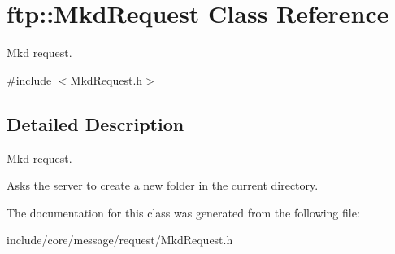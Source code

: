 \hypertarget{classftp_1_1_mkd_request}{\section{ftp\-:\-:Mkd\-Request Class Reference}
\label{classftp_1_1_mkd_request}
}


Mkd request.  




{\ttfamily \#include $<$Mkd\-Request.\-h$>$}



\subsection{Detailed Description}
Mkd request. 

Asks the server to create a new folder in the current directory. 

The documentation for this class was generated from the following file\-:\begin{DoxyCompactItemize}
\item 
include/core/message/request/Mkd\-Request.\-h\end{DoxyCompactItemize}
